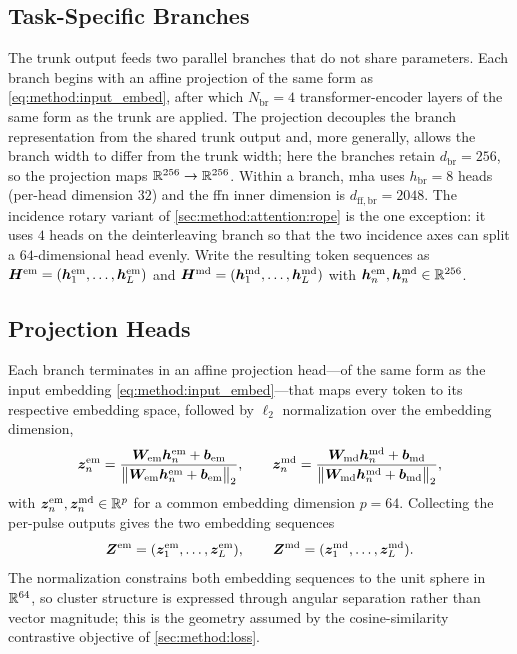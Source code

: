 \subsection*{Task-Specific Branches}

The trunk output feeds two parallel branches that do not share parameters.
Each branch begins with an affine projection of the same form as \cref{eq:method:input_embed}, after which $N_{\mathrm{br}} = 4$ transformer-encoder layers of the same form as the trunk are applied.
The projection decouples the branch representation from the shared trunk output and, more generally, allows the branch width to differ from the trunk width; here the branches retain $d_{\mathrm{br}} = 256$, so the projection maps $\mathbb{R}^{256} \to \mathbb{R}^{256}$.
Within a branch, \gls{mha} uses $h_{\mathrm{br}} = 8$ heads (per-head dimension $32$) and the \gls{ffn} inner dimension is $d_{\mathrm{ff,br}} = 2048$.
The incidence rotary variant of \cref{sec:method:attention:rope} is the one exception: it uses $4$ heads on the deinterleaving branch so that the two incidence axes can split a $64$-dimensional head evenly.
Write the resulting token sequences as $\bm{H}^{\mathrm{em}} = (\bm{h}^{\mathrm{em}}_1,\ldots,\bm{h}^{\mathrm{em}}_L)$ and $\bm{H}^{\mathrm{md}} = (\bm{h}^{\mathrm{md}}_1,\ldots,\bm{h}^{\mathrm{md}}_L)$ with $\bm{h}^{\mathrm{em}}_n, \bm{h}^{\mathrm{md}}_n \in \mathbb{R}^{256}$.

\subsection*{Projection Heads}

Each branch terminates in an affine projection head---of the same form as the input embedding \cref{eq:method:input_embed}---that maps every token to its respective embedding space, followed by $\ell_2$ normalization over the embedding dimension,
\begin{equation}\label{eq:method:proj_heads}
  \bm{z}^{\mathrm{em}}_n
  = \frac{\bm{W}_{\mathrm{em}}\bm{h}^{\mathrm{em}}_n + \bm{b}_{\mathrm{em}}}
         {\bigl\lVert \bm{W}_{\mathrm{em}}\bm{h}^{\mathrm{em}}_n + \bm{b}_{\mathrm{em}} \bigr\rVert_2},
  \qquad
  \bm{z}^{\mathrm{md}}_n
  = \frac{\bm{W}_{\mathrm{md}}\bm{h}^{\mathrm{md}}_n + \bm{b}_{\mathrm{md}}}
         {\bigl\lVert \bm{W}_{\mathrm{md}}\bm{h}^{\mathrm{md}}_n + \bm{b}_{\mathrm{md}} \bigr\rVert_2},
\end{equation}
with $\bm{z}^{\mathrm{em}}_n, \bm{z}^{\mathrm{md}}_n \in \mathbb{R}^{p}$ for a common embedding dimension $p = 64$.
Collecting the per-pulse outputs gives the two embedding sequences
\begin{equation}\label{eq:method:dual_embeddings}
  \bm{Z}^{\mathrm{em}} = (\bm{z}^{\mathrm{em}}_1,\ldots,\bm{z}^{\mathrm{em}}_L),
  \qquad
  \bm{Z}^{\mathrm{md}} = (\bm{z}^{\mathrm{md}}_1,\ldots,\bm{z}^{\mathrm{md}}_L).
\end{equation}
The normalization constrains both embedding sequences to the unit sphere in $\mathbb{R}^{64}$, so cluster structure is expressed through angular separation rather than vector magnitude; this is the geometry assumed by the cosine-similarity contrastive objective of \cref{sec:method:loss}.


